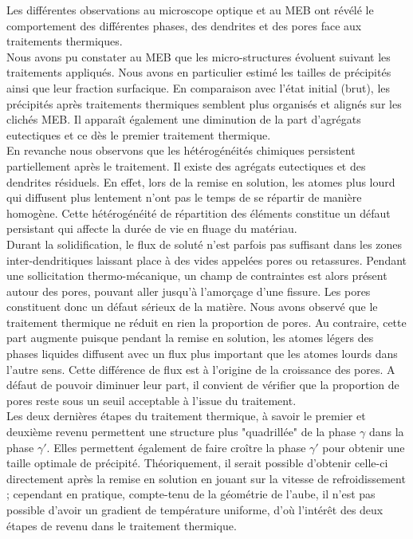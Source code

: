 Les différentes observations au microscope optique et au MEB ont révélé le comportement des
différentes phases, des dendrites et des pores face aux traitements thermiques.\\


Nous avons pu constater au MEB que les micro-structures évoluent suivant les  
traitements appliqués. Nous avons en particulier estimé les tailles de précipités ainsi que leur fraction 
surfacique. En comparaison avec l’état initial (brut), les précipités après traitements thermiques semblent 
plus organisés et alignés sur les clichés MEB. Il apparaît également une diminution de la part 
d'agrégats eutectiques et ce dès le premier traitement thermique.\\



En revanche nous observons que les hétérogénéités chimiques persistent partiellement après le traitement. Il 
existe des agrégats eutectiques et des dendrites résiduels. En effet, lors de la remise en 
solution, les atomes plus lourd qui diffusent plus lentement n’ont pas le temps de se répartir de manière 
homogène. Cette hétérogénéité de répartition des éléments constitue un défaut persistant qui affecte la durée 
de vie en fluage du matériau.\\



Durant la solidification, le flux de soluté n’est parfois pas suffisant dans les zones inter-dendritiques 
laissant place à des vides appelées pores ou retassures. Pendant une sollicitation thermo-mécanique, un champ 
de contraintes est alors présent autour des pores, pouvant aller jusqu’à l’amorçage d’une fissure. Les pores 
constituent donc un défaut sérieux de la matière. Nous avons observé que le traitement thermique ne réduit en 
rien la proportion de pores. Au contraire, cette part augmente puisque pendant la remise en solution, les 
atomes légers des phases liquides diffusent avec un flux plus important que les atomes lourds dans l'autre 
sens. Cette différence de flux est à l'origine de la croissance des pores. A défaut de pouvoir diminuer leur 
part, il convient de vérifier que la proportion de pores reste sous un seuil acceptable à l'issue du 
traitement.\\



Les deux dernières étapes du traitement thermique, à savoir le premier et deuxième revenu permettent une 
structure plus "quadrillée" de la phase $\gamma$ dans la phase $\gamma'$. Elles permettent également de faire 
croître la phase $\gamma'$ pour obtenir une taille optimale de précipité. Théoriquement, il serait possible 
d'obtenir celle-ci directement après la remise en solution en jouant sur la vitesse de 
refroidissement ; cependant en pratique, compte-tenu de la géométrie de l'aube, il n'est pas possible d'avoir un gradient de température uniforme, d'où l'intérêt des deux étapes de revenu dans le traitement thermique.\\
